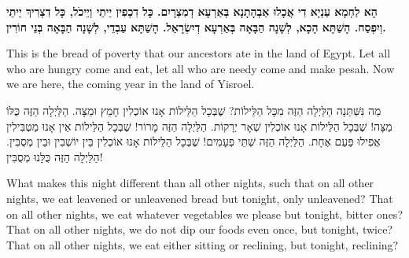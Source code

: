 

{\bfseries
הָא לַחְמָא עַנְיָא דִי אֲכָלוּ אַבְהָתָנָא בְּאַרְעָא דְמִצְרָיִם. כָּל דִכְפִין יֵיתֵי וְיֵיכֹל, כָּל דִצְרִיךְ יֵיתֵי וְיִפְסַח. הָשַׁתָּא הָכָא, לְשָׁנָה הַבָּאָה בְּאַרְעָא דְיִשְׂרָאֵל. הָשַׁתָּא עַבְדֵי, לְשָׁנָה הַבָּאָה בְּנֵי חוֹרִין.
}

\begin{english}
This is the bread of poverty that our ancestors ate in the land of Egypt. Let all who are hungry come and eat, let all who are needy come and make pesah. Now we are here, the coming year in the land of Yisroel.
\end{english}

\vspace{1em}



מַה נִּשְּׁתַּנָה הַלַּיְלָה הַזֶּה מִכָּל הַלֵּילוֹת? 
שֶׁבְּכָל הַלֵּילוֹת אָנוּ אוֹכְלִין חָמֵץ וּמַצָּה. הַלַּיְלָה הַזֶּה כֻּלּוֹ מַצָּה!
שֶׁבְּכָל הַלֵּילוֹת אָנוּ אוֹכְלִין שְׁאָר יְרָקוֹת. הַלַּיְלָה הַזֶּה מָרוֹר!
שֶׁבְּכָל הַלֵּילוֹת אֵין אָנוּ מַטְבִּילִין אֲפִילוּ פַּעַם אֶחָת. הַלַּיְלָה הַזֶּה שְׁתֵּי פְעָמִים!
שֶׁבְּכָל הַלֵּילוֹת אָנוּ אוֹכְלִין בֵּין יוֹשְׁבִין וּבֵין מְסֻבִּין. הַלַּיְלָה הַזֶּה כֻּלָּנוּ מְסֻבִּין!

\begin{english}
What makes this night different than all other nights, such that on all other nights, we eat leavened or unleavened bread but tonight, only unleavened? That on all other nights, we eat whatever vegetables we please but tonight, bitter ones? That on all other nights, we do not dip our foods even once, but tonight, twice? That on all other nights, we eat either sitting or reclining, but tonight, reclining?
\end{english}

\vspace{1em}



